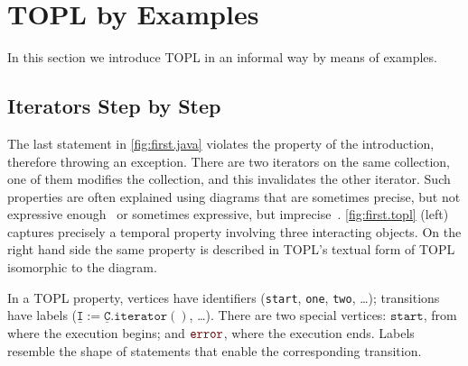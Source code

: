 \documentclass{sigplanconf}[10pt] %
\newcommand{\error}{\ensuremath{\textcolor{darkred}{\mathtt{error}}}\xspace}
\newcommand{\pattern}[1]{\ensuremath{\mathtt{\underline{#1}}}}
\newcommand{\start}{\ensuremath{\mathtt{start}}\xspace}
\begin{document}
\section{TOPL by Examples} \label{sec:examples} %

In this section we introduce TOPL in an informal way by means of examples.

\subsection{Iterators Step by Step} \label{sec:examples.steps} %

The last statement in \autoref{fig:first.java} violates the property of the introduction, therefore throwing an exception.
There are two iterators on the same collection, one of them modifies the collection, and this invalidates the other iterator.
Such properties are often explained using diagrams that are sometimes precise, but not expressive enough~\cite{dblp:journals/scp/FieldGRY05,dblp:conf/issta/FinkYDRG06} or sometimes expressive, but imprecise~\cite{dblp:conf/oopsla/bierhoffa07,dblp:conf/oopsla/naeeml08,dblp:conf/sigsoft/boddenlh08,dblp:conf/ecoop/bierhoffba09}.
\autoref{fig:first.topl} (left)  captures precisely a temporal property involving three interacting objects.
On the right hand side  the same property is described in TOPL's textual form of TOPL isomorphic to the diagram.

In a TOPL property, vertices have identifiers (\texttt{start}, \texttt{one}, \texttt{two}, \dots);
transitions have labels ($\pattern I:=\pattern C.\mathtt{iterator}()$, \dots).
There are two special vertices: \start, from where the execution begins; and \error, where the execution ends.
Labels resemble the shape of statements that enable the corresponding transition.
\end{document}
